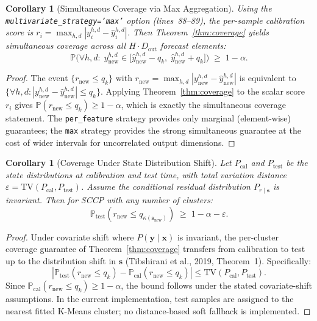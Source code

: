 \documentclass[11pt]{article}
\newtheorem{corollary}[theorem]{Corollary}
\newcommand{\Pbb}{\mathbb{P}}
\begin{document}

\begin{corollary}[Simultaneous Coverage via Max Aggregation]\label{cor:simultaneous}
Using the \texttt{multivariate\_strategy='max'} option (lines~88--89), the per-sample calibration score is $r_i = \max_{h,d} |y_i^{h,d} - \hat{y}_i^{h,d}|$. Then Theorem~\ref{thm:coverage} yields simultaneous coverage across all $H \cdot D_{\text{out}}$ forecast elements:
\[
\Pbb\Big(\forall h,d:\; y_{\text{new}}^{h,d} \in \big[\hat{y}_{\text{new}}^{h,d} - q_k,\; \hat{y}_{\text{new}}^{h,d} + q_k\big]\Big) \;\geq\; 1 - \alpha.
\]
\end{corollary}
\begin{proof}
The event $\{r_{\text{new}} \leq q_k\}$ with $r_{\text{new}} = \max_{h,d} |y_{\text{new}}^{h,d} - \hat{y}_{\text{new}}^{h,d}|$ is equivalent to $\{\forall h,d: |y_{\text{new}}^{h,d} - \hat{y}_{\text{new}}^{h,d}| \leq q_k\}$. Applying Theorem~\ref{thm:coverage} to the scalar score $r_i$ gives $\Pbb(r_{\text{new}} \leq q_k) \geq 1-\alpha$, which is exactly the simultaneous coverage statement. The \texttt{per\_feature} strategy provides only marginal (element-wise) guarantees; the \texttt{max} strategy provides the strong simultaneous guarantee at the cost of wider intervals for uncorrelated output dimensions.
\end{proof}

\begin{corollary}[Coverage Under State Distribution Shift]\label{cor:distribution-shift}
Let $P_{\text{cal}}$ and $P_{\text{test}}$ be the state distributions at calibration and test time, with total variation distance $\varepsilon = \text{TV}(P_{\text{cal}}, P_{\text{test}})$. Assume the conditional residual distribution $P_{r \mid \mathbf{s}}$ is invariant. Then for SCCP with any number of clusters:
\[
\Pbb_{\text{test}}(r_{\text{new}} \leq q_{\kappa(\mathbf{s}_{\text{new}})}) \;\geq\; 1 - \alpha - \varepsilon.
\]
\end{corollary}
\begin{proof}
Under covariate shift where $P(\mathbf{y} \mid \mathbf{x})$ is invariant, the per-cluster coverage guarantee of Theorem~\ref{thm:coverage} transfers from calibration to test up to the distribution shift in $\mathbf{s}$ (Tibshirani et al., 2019, Theorem~1). Specifically:
\[
|\Pbb_{\text{test}}(r_{\text{new}} \leq q_k) - \Pbb_{\text{cal}}(r_{\text{new}} \leq q_k)| \leq \text{TV}(P_{\text{cal}}, P_{\text{test}}).
\]
Since $\Pbb_{\text{cal}}(r_{\text{new}} \leq q_k) \geq 1-\alpha$, the bound follows under the stated covariate-shift assumptions. In the current implementation, test samples are assigned to the nearest fitted K-Means cluster; no distance-based soft fallback is implemented.
\end{proof}
\end{document}
